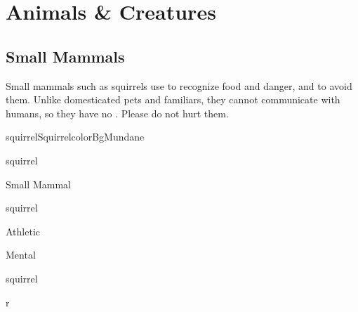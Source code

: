 \section{Animals \& Creatures}
\label{sec:animals}

\subsection{Small Mammals}


Small mammals such as squirrels use  to recognize food and danger,
and  to avoid them.
Unlike domesticated pets and familiars, they cannot communicate with
humans, so they have no .
Please do not hurt them.\\

\begin{actorCardMiniEuro}{squirrel}{Squirrel}{colorBgMundane}
	\begin{natureBox}{squirrel}
		\begin{natureTable}{Small Mammal}
		\end{natureTable}
	\end{natureBox}

	\begin{capabilitiesBox}{squirrel}
		\begin{capabilitiesTable}{Athletic}
		\end{capabilitiesTable}
		\begin{capabilitiesTable}{Mental}
		\end{capabilitiesTable}
	\end{capabilitiesBox}{squirrel}

\end{actorCardMiniEuro}

\begin{wrapfigure}{r}{}
\end{wrapfigure}



